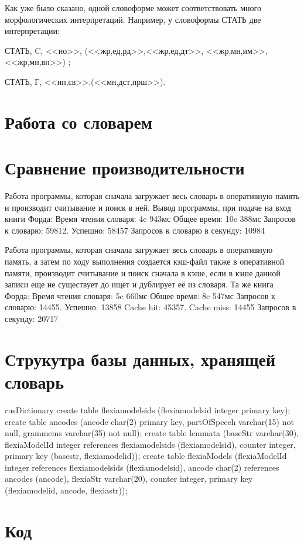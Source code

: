 \documentclass[12pt,a4paper,onecolumn]{report}
\begin{document}
Как уже было сказано, одной словоформе может соответствовать много морфологических интерпретаций. Например, у словоформы СТАТЬ две интерпретации:

{СТАТЬ, C, <<но>>, (<<жр,ед,рд>>,<<жр,ед,дт>>, <<жр,мн,им>>, <<жр,мн,вн>>) };

{СТАТЬ, Г, <<нп,св>>,(<<мн,дст,прш>>)}.
\chapter{Работа со словарем}

\chapter{Сравнение производительности}
Работа программы, которая сначала загружает весь словарь в оперативную память и производит считывание и поиск в ней.
Вывод программы, при подаче на вход книги Форда:
Время чтения словаря: 4c 943мс
Общее время: 10c 388мс
Запросов к словарю: 59812. Успешно: 58457
Запросов к словарю в секунду: 10984

Работа программы, которая сначала загружает весь словарь в оперативную память, а затем по ходу выполнения создается кэш-файл также в оперативной памяти, производит считывание и поиск сначала в кэше, если в кэше данной записи еще не существует до ищет и дублирует её из словаря.
Та же книга Форда:
Время чтения словаря: 5c 660мс
Общее время: 8c 547мс
Запросов к словарю: 14455. Успешно: 13858
Cache hit: 45357. Cache miss: 14455
Запросов в секунду: 20717

\chapter{Струкутра базы данных, хранящей словарь}
rusDictionary
create table flexiamodelsids (flexiamodelsid integer primary key); 
create table ancodes (ancode char(2) primary key, partOfSpeech varchar(15) not null, grammems varchar(35) not null); 
create table lemmata (baseStr varchar(30), flexiaModelId integer references flexiamodelsids (flexiamodelsid), counter integer, primary key (basestr, flexiamodelid)); 
create table flexiaModels (flexiaModelId integer references flexiamodelsids (flexiamodelsid), ancode char(2) references ancodes (ancode), flexiaStr varchar(20), counter integer, primary key (flexiamodelid, ancode, flexiastr));




\chapter{Код}

\end{document}
